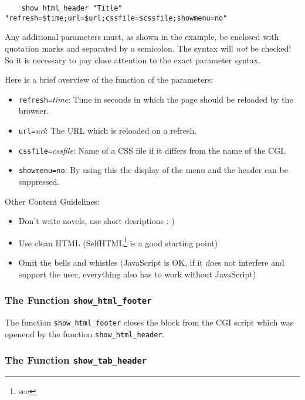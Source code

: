 \begin{example}
\begin{verbatim}
    show_html_header "Title" "refresh=$time;url=$url;cssfile=$cssfile;showmenu=no"
\end{verbatim}
\end{example}

Any additional parameters must, as shown in the example, be enclosed with quotation marks
and separated by a semicolon. The syntax will \emph{not} be checked! So it is necessary to pay
close attention to the exact parameter syntax.

Here is a brief overview of the function of the parameters:
\begin{itemize}
 \item \texttt{refresh=}\emph{time}: Time in seconds in which the page should be reloaded by the browser.
 \item \texttt{url=}\emph{url}: The URL which is reloaded on a refresh.
 \item \texttt{cssfile=}\emph{cssfile}: Name of a CSS file if it differs from the name of the CGI.
 \item \texttt{showmenu=no}: By using this the display of the menu and the header can be suppressed.
\end{itemize}

Other Content Guidelines:

\begin{itemize}
 \item Don't write novels, use short desriptions :-)
 \item Use clean HTML (SelfHTML\footnote{see
    } is a good starting point)
 \item Omit the bells and whistles (JavaScript is OK, if it
does not interfere and support the user, everything also has to
work without JavaScript)
\end{itemize}

\subsubsection{The Function \texttt{show\_html\_footer}}

The function \texttt{show\_html\_footer} closes the block from the CGI script which was
openend by the function \texttt{show\_html\_header}.

\subsubsection{The Function \texttt{show\_tab\_header}}

